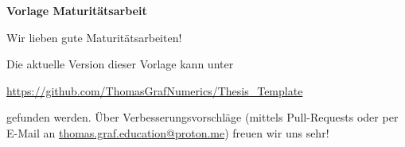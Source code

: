 \begin{titlepage}
	\thispagestyle{empty}
	\begin{center}
		\vspace*{1cm}

		{\Huge
			\textbf{Vorlage Maturitätsarbeit}

			\vspace{0.5cm}
			\LARGE
			Wir lieben gute Maturitätsarbeiten!

			\vspace{1.5cm}

			\textbf{}
		}
		\vfill
		\clearpage
		\thispagestyle{empty}
		\mbox{}
		\vfill
		{\Large }

		\noindent
		Die aktuelle Version dieser Vorlage kann unter
		\begin{center}
			{\footnotesize
				\url{https://github.com/ThomasGrafNumerics/Thesis_Template}
			}
		\end{center}
		gefunden werden. Über Verbesserungsvorschläge (mittels Pull-Requests oder per E-Mail an \href{mailto:thomas.graf.education@proton.me}{thomas.graf.education@proton.me}) freuen wir uns sehr!
		\vspace{0.8cm}
	\end{center}
\end{titlepage}
